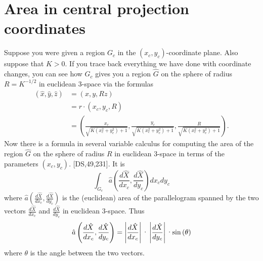 \documentclass{ximera}
\begin{document}
\section{Area in central projection coordinates}

Suppose you were given a region $G_{c}$ in the $\left(  x_{c},y_{c}\right)
$-coordinate plane. Also suppose that $K>0$. If you trace back everything we
have done with coordinate changes, you can see how $G_{c}$ gives you a region
$\hat{G}$ on the sphere of radius $R=K^{-1/2}$ in euclidean $3$-space via the
formulas%
\begin{align*}
\left(  \hat{x},\hat{y},\hat{z}\right)   &  =\left(  x,y,Rz\right) \\
&  =r\cdot\left(  x_{c},y_{c},R\right) \\
&  =\left(  \frac{x_{c}}{\sqrt{K\left(  x_{c}^{2}+y_{c}^{2}\right)  +1}}%
,\frac{y_{c}}{\sqrt{K\left(  x_{c}^{2}+y_{c}^{2}\right)  +1}},\frac{R}%
{\sqrt{K\left(  x_{c}^{2}+y_{c}^{2}\right)  +1}}\right)  .
\end{align*}
Now there is a formula in several variable calculus for computing the area of
the region $\hat{G}$ on the sphere of radius $R$ in euclidean $3$-space in
terms of the parameters $\left(  x_{c},y_{c}\right)  $. [DS,49,231]. It is
\begin{equation}%
\int_{G_{c}}
\hat{a}\left(  \frac{d\hat{X}}{dx_{c}},\frac{d\hat{X}}{dy_{c}}\right)
dx_{c}dy_{c} \label{68}%
\end{equation}
where $\hat{a}\left(  \frac{d\hat{X}}{dx_{c}},\frac{d\hat{X}}{dy_{c}}\right)
$ is the (euclidean) area of the parallelogram spanned by the two vectors
$\frac{d\hat{X}}{dx_{c}}$ and $\frac{d\hat{X}}{dy_{c}}$ in euclidean
$3$-space. Thus%
\[
\hat{a}\left(  \frac{d\hat{X}}{dx_{c}},\frac{d\hat{X}}{dy_{c}}\right)
=\left\vert \frac{d\hat{X}}{dx_{c}}\right\vert \text{\textperiodcentered
}\left\vert \frac{d\hat{X}}{dy_{c}}\right\vert \text{\textperiodcentered
}\mathrm{sin}\left(  \theta\right)
\]
where $\theta$ is the angle between the two vectors.
\end{document}
